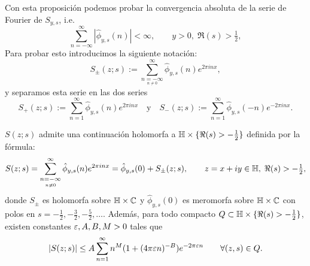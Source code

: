 Con esta proposici\'on podemos probar la convergencia absoluta de la serie
de Fourier de $S_{y,s}$, i.e.
\[
  \sum_{n=-\infty}^{\infty}|\hat{\phi}_{y,s}(n)|<\infty,\qquad y>0,\; \Re(s)>\tfrac{1}{2},
\]
Para probar esto introducimos la siguiente notaci\'on:
\[
  S_{\pm}(z;s):=\sum_{\underset{n\neq0}{n=-\infty}}^{\infty}\hat{\phi}_{y,s}(n)e^{2\pi inx},
\]
y separamos esta serie en las dos series
\[
  S_+(z;s):=\sum_{n=1}^{\infty}\hat{\phi}_{y,s}(n)e^{2\pi inx}\quad\text{y}\quad
  S_-(z;s):=\sum_{n=1}^{\infty}\hat{\phi}_{y,s}(-n)e^{-2\pi inx}.
\]


\begin{cor}\label{thm:S_holomorfo_gen}%
  $S(z;s)$ admite una continuaci\'on holomorfa a $\mathbb{H}\times\{\Re(s)>-\tfrac{1}{2}\}$
  definida por la f\'ormula:
  \begin{equation}\label{eq:exp_fourier_S}
    S(z;s)
    =\sum_{\underset{n\neq0}{n=-\infty}}^{\infty}\hat{\phi}_{y,s}(n)e^{2\pi inx}
    =\hat{\phi}_{y,s}(0)+S_{\pm}(z;s),
    \qquad z=x+iy\in\mathbb{H},\; \Re(s)>-\tfrac{1}{2},
  \end{equation}
  donde $S_{\pm}$ es holomorfa sobre $\mathbb{H}\times\mathbb{C}$ y $\hat{\phi}_{y,s}(0)$ es
  meromorfa sobre $\mathbb{H}\times\mathbb{C}$ con polos en $s=-\tfrac{1}{2},-\tfrac{3}{2},-\tfrac{5}{2},\ldots$.
  Adem\'as, para todo compacto $Q\subset\mathbb{H}\times\{\Re(s)>-\tfrac{1}{2}\}$,
  existen constantes $\varepsilon,A,B,M>0$ tales que
  \[
    |S(z;s)|\leq A\sum_{n=1}^{\infty}n^M(1+(4\pi\varepsilon n)^{-B})e^{-2\pi\varepsilon n}
    \qquad\forall(z,s)\in Q.
  \]
\end{cor}%
